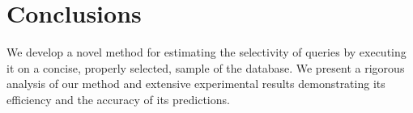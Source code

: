 %
\section{Conclusions}\label{sec:compar}
We develop a novel method for estimating the selectivity of queries by executing
it on a concise, properly selected, sample of the database. We present a
rigorous analysis of our method and extensive experimental results demonstrating
its efficiency and the accuracy of its predictions.

